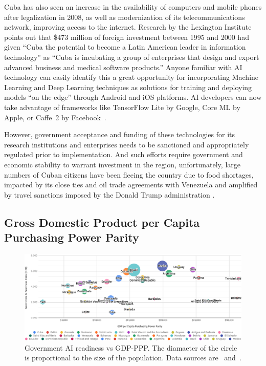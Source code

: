 \documentclass[conference]{IEEEtran}
\begin{document}
Cuba has also seen an increase in the availability of computers and mobile phones after legalization in 2008, as well as modernization of its telecommunications network, improving access to the internet. Research by the Lexington Institute~\cite{peters2001cuba} points out that \$473 million of foreign investment between 1995 and 2000 had given ``Cuba the potential to become a Latin American leader in information technology'' as ``Cuba is incubating a group of enterprises that design and export advanced business and medical software products.'' Anyone familiar with AI technology can easily identify this a great opportunity for incorporating Machine Learning and Deep Learning techniques as solutions for training and deploying models ``on the edge'' through Android and iOS platforms. AI developers can now take advantage of frameworks like TensorFlow Lite
by Google, Core ML
by Apple, or Caffe~2
by Facebook~\cite{jia2016delivering}.

However, government acceptance and funding of these technologies for its research institutions and enterprises needs to be sanctioned and appropriately regulated prior to implementation. And such efforts require government and economic stability to warrant investment in the region, unfortunately, large numbers of Cuban citizens have been fleeing the country due to food shortages, impacted by its close ties and oil trade agreements with Venezuela and amplified by travel sanctions imposed by the Donald Trump administration \cite{cordoba2019cuba}.

\subsection{Gross Domestic Product per Capita Purchasing Power Parity}

\begin{figure}[!t]
\centering
\includegraphics[width=\textwidth]{gdp-ppp}
\caption{Government AI readiness vs GDP-PPP. The diamaeter of the circle is proportional to the size of the population. Data sources are~\cite{miller2019government} and~\cite{central2019world}.}
\label{fig:gdp-ppp}
\end{figure}
\end{document}
